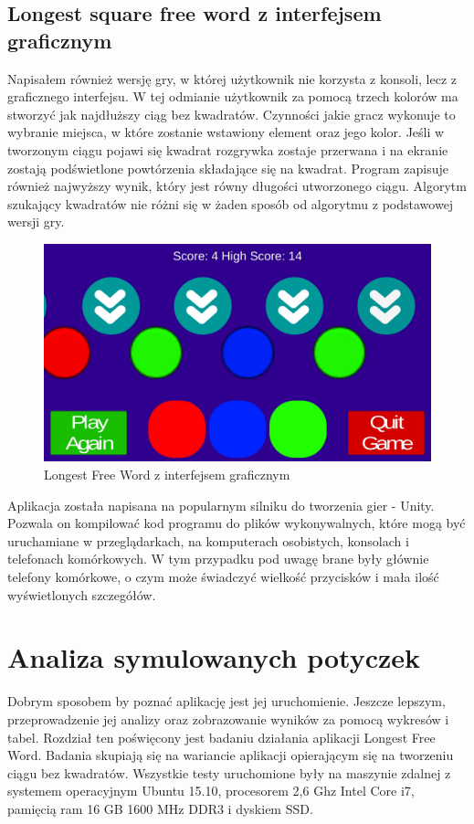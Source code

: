 \documentclass[document]{xmgr}
\begin{document}
\section{Longest square free word z interfejsem graficznym}
Napisałem również wersję gry, w której użytkownik nie korzysta z konsoli, lecz z graficznego interfejsu. W tej odmianie użytkownik za pomocą trzech kolorów ma stworzyć jak najdłuższy ciąg bez kwadratów. Czynności jakie gracz wykonuje to wybranie miejsca, w które zostanie wstawiony element oraz jego kolor. Jeśli w tworzonym ciągu pojawi się kwadrat rozgrywka zostaje przerwana i na ekranie zostają podświetlone powtórzenia składające się na kwadrat. Program zapisuje również najwyższy wynik, który jest równy długości utworzonego ciągu. Algorytm szukający kwadratów nie różni się w żaden sposób od algorytmu z podstawowej wersji gry.

\begin{figure}[H]
    \centering
    \includegraphics[scale = 0.2]{images/thueMobile}
    \caption{Longest Free Word z interfejsem graficznym}
    \label{fig:thueMobile}
\end{figure}

Aplikacja została napisana na popularnym silniku do tworzenia gier - Unity. Pozwala on kompilować kod programu do plików wykonywalnych, które mogą być uruchamiane w przeglądarkach, na komputerach osobistych, konsolach i telefonach komórkowych. W tym przypadku pod uwagę brane były głównie telefony komórkowe, o czym może świadczyć wielkość przycisków i mała ilość wyświetlonych szczegółów.


\chapter{Analiza symulowanych potyczek} 
Dobrym sposobem by poznać aplikację jest jej uruchomienie. Jeszcze lepszym, przeprowadzenie jej analizy oraz zobrazowanie wyników za pomocą wykresów i tabel. Rozdział ten poświęcony jest badaniu działania aplikacji Longest Free Word. Badania skupiają się na wariancie aplikacji opierającym się na tworzeniu ciągu bez kwadratów. Wszystkie testy uruchomione były na maszynie zdalnej z systemem operacyjnym Ubuntu 15.10, procesorem 2,6 Ghz Intel Core i7, pamięcią ram 16 GB 1600 MHz DDR3 i dyskiem SSD.
\end{document}
